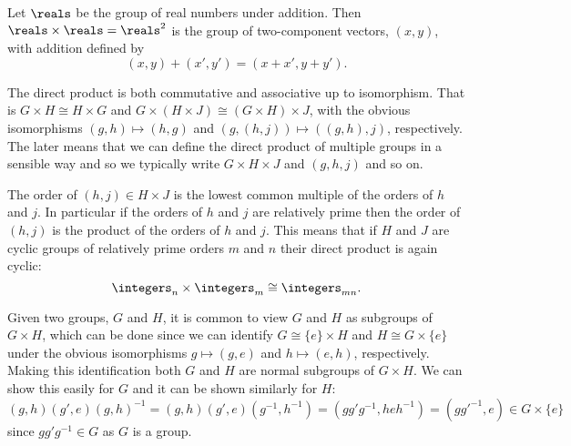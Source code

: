 \documentclass[fleqn]{NotesClass}
\newcommand*{\isomorphic}{\cong}
\begin{document}
    \begin{exm}{}{}
        Let \(\reals\) be the group of real numbers under addition.
        Then \(\reals\times\reals = \reals^2\) is the group of two-component vectors, \((x, y)\), with addition defined by
        \begin{equation}
            (x, y) + (x', y') = (x + x', y + y').
        \end{equation}
    \end{exm}

    The direct product is both commutative and associative up to isomorphism.
    That is \(G \times H \isomorphic H \times G\) and \(G \times (H \times J) \isomorphic (G \times H) \times J\), with the obvious isomorphisms \((g, h) \mapsto (h, g)\) and \((g, (h, j)) \mapsto ((g, h), j)\), respectively.
    The later means that we can define the direct product of multiple groups in a sensible way and so we typically write \(G \times H \times J\) and \((g, h, j)\) and so on.
    
    The order of \((h, j) \in H \times J\) is the lowest common multiple of the orders of \(h\) and \(j\).
    In particular if the orders of \(h\) and \(j\) are relatively prime then the order of \((h, j)\) is the product of the orders of \(h\) and \(j\).
    This means that if \(H\) and \(J\) are cyclic groups of relatively prime orders \(m\) and \(n\) their direct product is again cyclic:
    \begin{equation}
        \integers_{n} \times \integers_{m} \isomorphic \integers_{mn}.
    \end{equation}

    Given two groups, \(G\) and \(H\), it is common to view \(G\) and \(H\) as subgroups of \(G \times H\), which can be done since we can identify \(G \isomorphic \{e\} \times H\) and \(H \isomorphic G \times \{e\}\) under the obvious isomorphisms \(g \mapsto (g, e)\) and \(h \mapsto (e, h)\), respectively.
    Making this identification both \(G\) and \(H\) are normal subgroups of \(G\times H\).
    We can show this easily for \(G\) and it can be shown similarly for \(H\):
    \begin{equation}
        (g, h)(g', e)(g, h)^{-1} = (g, h)(g', e)(g^{-1}, h^{-1}) = (gg'g^{-1}, heh^{-1}) = (gg'^{-1}, e) \in G \times \{e\}
    \end{equation}
    since \(gg'g^{-1} \in G\) as \(G\) is a group.
    
\end{document}
